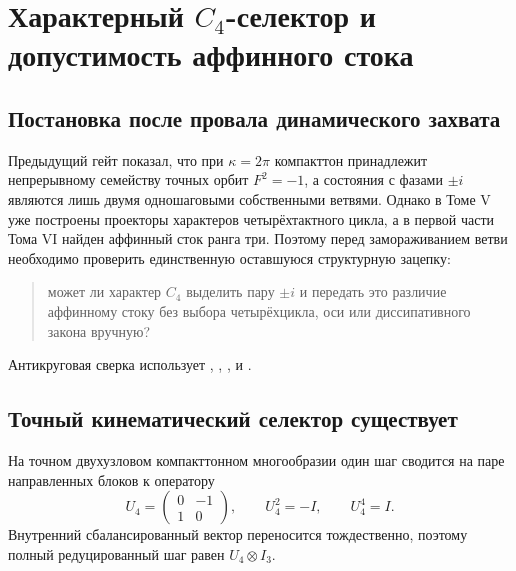 \chapter{Характерный \texorpdfstring{$C_4$}{C4}-селектор и допустимость аффинного стока}
\label{ch:v6-spectral-transition-compacton-c4-affine-selector-admissibility-gate}

\section{Постановка после провала динамического захвата}

Предыдущий гейт показал, что при $\kappa=2\pi$ компакттон принадлежит
непрерывному семейству точных орбит $F^2=-1$, а состояния с фазами
$\pm i$ являются лишь двумя одношаговыми собственными ветвями. Однако в
Томе V уже построены проекторы характеров четырёхтактного цикла, а в
первой части Тома VI найден аффинный сток ранга три. Поэтому перед
замораживанием ветви необходимо проверить единственную оставшуюся
структурную зацепку:

\begin{quote}
может ли характер $C_4$ выделить пару $\pm i$ и передать это различие
аффинному стоку без выбора четырёхцикла, оси или диссипативного закона
вручную?
\end{quote}

Антикруговая сверка использует
,
,
,
 и
.

\section{Точный кинематический селектор существует}

На точном двухузловом компакттонном многообразии один шаг сводится на
паре направленных блоков к оператору
\begin{equation}
 U_4=
 \begin{pmatrix}
  0&-1\\
  1&0
 \end{pmatrix},
 \qquad
 U_4^2=-I,
 \qquad
 U_4^4=I.
 \label{eq:v6-compacton-reduced-c4-step}
\end{equation}
Внутренний сбалансированный вектор переносится тождественно, поэтому
полный редуцированный шаг равен $U_4\otimes I_3$.

